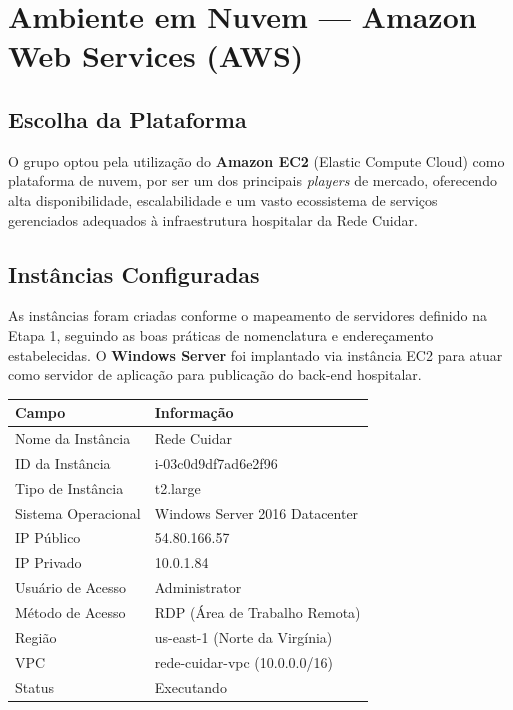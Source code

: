 \documentclass[12pt,a4paper,oneside]{report}
\begin{document}
\section{Ambiente em Nuvem --- Amazon Web Services (AWS)}

\subsection{Escolha da Plataforma}
O grupo optou pela utilização do \textbf{Amazon EC2} (Elastic Compute Cloud) como plataforma de nuvem, por ser um dos principais \textit{players} de mercado, oferecendo alta disponibilidade, escalabilidade e um vasto ecossistema de serviços gerenciados adequados à infraestrutura hospitalar da Rede Cuidar.

\subsection{Instâncias Configuradas}
As instâncias foram criadas conforme o mapeamento de servidores definido na Etapa 1, seguindo as boas práticas de nomenclatura e endereçamento estabelecidas. O \textbf{Windows Server} foi implantado via instância EC2 para atuar como servidor de aplicação para publicação do back-end hospitalar.

\begin{center}
\small
\begin{tabular}{ll}
\toprule
\textbf{Campo} & \textbf{Informação} \\ \midrule
Nome da Instância    & Rede Cuidar \\
ID da Instância      & i-03c0d9df7ad6e2f96 \\
Tipo de Instância    & t2.large \\
Sistema Operacional  & Windows Server 2016 Datacenter \\
IP Público           & 54.80.166.57 \\
IP Privado           & 10.0.1.84 \\
Usuário de Acesso    & Administrator \\
Método de Acesso     & RDP (Área de Trabalho Remota) \\
Região               & us-east-1 (Norte da Virgínia) \\
VPC                  & rede-cuidar-vpc (10.0.0.0/16) \\
Status               & Executando \\
\bottomrule
\end{tabular}
\end{center}
\end{document}
